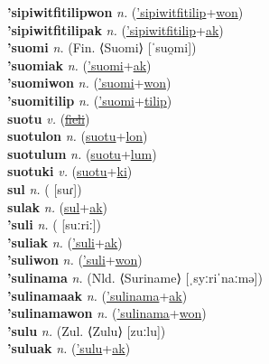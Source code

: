 \textbf{'sipiwitfitilipwon} \textit{n.} (\hyperref['sipiwitfitilip]{'sipiwitfitilip}+\hyperref[won]{won})
 \label{'sipiwitfitilipwon} \\
\textbf{'sipiwitfitilipak} \textit{n.} (\hyperref['sipiwitfitilip]{'sipiwitfitilip}+\hyperref[ak]{ak})
 \label{'sipiwitfitilipak} \\
\textbf{'suomi} \textit{n.} (Fin. ⟨Suomi⟩ [ˈsuo̯mi])
 \label{'suomi} \\
\textbf{'suomiak} \textit{n.} (\hyperref['suomi]{'suomi}+\hyperref[ak]{ak})
 \label{'suomiak} \\
\textbf{'suomiwon} \textit{n.} (\hyperref['suomi]{'suomi}+\hyperref[won]{won})
 \label{'suomiwon} \\
\textbf{'suomitilip} \textit{n.} (\hyperref['suomi]{'suomi}+\hyperref[tilip]{tilip})
 \label{'suomitilip} \\
\textbf{suotu} \textit{v.} (\hyperref[fieli]{\sout{fieli}})
 \label{suotu} \\
\textbf{suotulon} \textit{n.} (\hyperref[suotu]{suotu}+\hyperref[lon]{lon})
 \label{suotulon} \\
\textbf{suotulum} \textit{n.} (\hyperref[suotu]{suotu}+\hyperref[lum]{lum})
 \label{suotulum} \\
\textbf{suotuki} \textit{v.} (\hyperref[suotu]{suotu}+\hyperref[ki]{ki})
 \label{suotuki} \\
\textbf{sul} \textit{n.} ( [suɾ])
 \label{sul} \\
\textbf{sulak} \textit{n.} (\hyperref[sul]{sul}+\hyperref[ak]{ak})
 \label{sulak} \\
\textbf{'suli} \textit{n.} ( [suːriː])
 \label{'suli} \\
\textbf{'suliak} \textit{n.} (\hyperref['suli]{'suli}+\hyperref[ak]{ak})
 \label{'suliak} \\
\textbf{'suliwon} \textit{n.} (\hyperref['suli]{'suli}+\hyperref[won]{won})
 \label{'suliwon} \\
\textbf{'sulinama} \textit{n.} (Nld. ⟨Suriname⟩ [ˌsyːriˈnaːmə])
 \label{'sulinama} \\
\textbf{'sulinamaak} \textit{n.} (\hyperref['sulinama]{'sulinama}+\hyperref[ak]{ak})
 \label{'sulinamaak} \\
\textbf{'sulinamawon} \textit{n.} (\hyperref['sulinama]{'sulinama}+\hyperref[won]{won})
 \label{'sulinamawon} \\
\textbf{'sulu} \textit{n.} (Zul. ⟨Zulu⟩ [zuːlu])
 \label{'sulu} \\
\textbf{'suluak} \textit{n.} (\hyperref['sulu]{'sulu}+\hyperref[ak]{ak})
